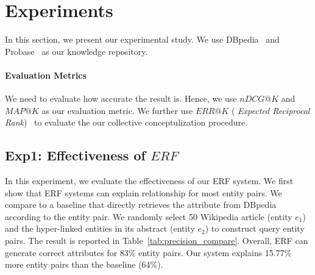 
\section{Experiments}
\label{sec:exp}

In this section, we present our experimental study.
We use DBpedia~\cite{dbpedia} and Probase~\cite{wu2012probase} as our knowledge repository.
\
\vspace{-4mm}
\paragraph*{Evaluation Metrics}
We need to evaluate how accurate the result is. 
Hence, we use $nDCG@K$ and $MAP@K$ as our evaluation metric.
We further use $ ERR@K$ ( {\it Expected Reciprocal Rank})~\cite{chapelle2009expected} to evaluate the our collective conceptulization procedure.



\subsection{Exp1: Effectiveness of $ERF$}
In this experiment, we evaluate the effectiveness of our ERF system.
We first show that ERF systems can explain relationship for most entity pairs.
We compare to a baseline that directly retrieves the attribute from DBpedia according to the entity pair.
We randomly select 50 Wikipedia article (entity $e_1$) and the hyper-linked entities in its abstract (entity $e_2$)
to construct query entity pairs.
The result is reported in Table~\ref{tab:precision_compare}.
Overall, ERF can generate correct attributes for 83\% entity pairs.
Our system explains 15.77\% more entity pairs than the baseline (64\%).

